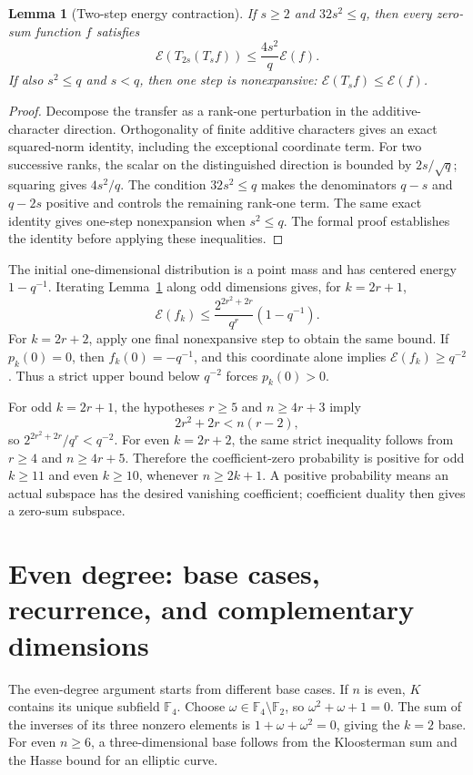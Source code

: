 \documentclass[11pt]{amsart}
\numberwithin{equation}{section}
\newtheorem{lemma}[theorem]{Lemma}
\theoremstyle{definition}
\theoremstyle{remark}
\begin{document}
\begin{lemma}[Two-step energy contraction]\label{lem:energy}
If $s\ge2$ and $32s^2\le q$, then every zero-sum function $f$ satisfies
\[
 \mathcal E(T_{2s}(T_sf))\le\frac{4s^2}{q}\mathcal E(f).
\]
If also $s^2\le q$ and $s<q$, then one step is nonexpansive: $\mathcal E(T_sf)\le\mathcal E(f)$.
\end{lemma}
\begin{proof}
Decompose the transfer as a rank-one perturbation in the additive-character direction. Orthogonality of finite additive characters gives an exact squared-norm identity, including the exceptional coordinate term. For two successive ranks, the scalar on the distinguished direction is bounded by $2s/\sqrt q$; squaring gives $4s^2/q$. The condition $32s^2\le q$ makes the denominators $q-s$ and $q-2s$ positive and controls the remaining rank-one term. The same exact identity gives one-step nonexpansion when $s^2\le q$. The formal proof establishes the identity before applying these inequalities.
\end{proof}

The initial one-dimensional distribution is a point mass and has centered energy $1-q^{-1}$. Iterating Lemma~\ref{lem:energy} along odd dimensions gives, for $k=2r+1$,
\[
 \mathcal E(f_k)\le \frac{2^{2r^2+2r}}{q^r}(1-q^{-1}).
\]
For $k=2r+2$, apply one final nonexpansive step to obtain the same bound. If $p_k(0)=0$, then $f_k(0)=-q^{-1}$, and this coordinate alone implies $\mathcal E(f_k)\ge q^{-2}$. Thus a strict upper bound below $q^{-2}$ forces $p_k(0)>0$.

For odd $k=2r+1$, the hypotheses $r\ge5$ and $n\ge4r+3$ imply
\[
 2r^2+2r<n(r-2),
\]
so $2^{2r^2+2r}/q^r<q^{-2}$. For even $k=2r+2$, the same strict inequality follows from $r\ge4$ and $n\ge4r+5$. Therefore the coefficient-zero probability is positive for odd $k\ge11$ and even $k\ge10$, whenever $n\ge2k+1$. A positive probability means an actual subspace has the desired vanishing coefficient; coefficient duality then gives a zero-sum subspace.

\section{Even degree: base cases, recurrence, and complementary dimensions}
\sloppy

The even-degree argument starts from different base cases. If $n$ is even, $K$ contains its unique subfield $\mathbb F_4$. Choose $\omega\in\mathbb F_4\setminus\mathbb F_2$, so $\omega^2+\omega+1=0$. The sum of the inverses of its three nonzero elements is $1+\omega+\omega^2=0$, giving the $k=2$ base. For even $n\ge6$, a three-dimensional base follows from the Kloosterman sum and the Hasse bound for an elliptic curve.
\end{document}
